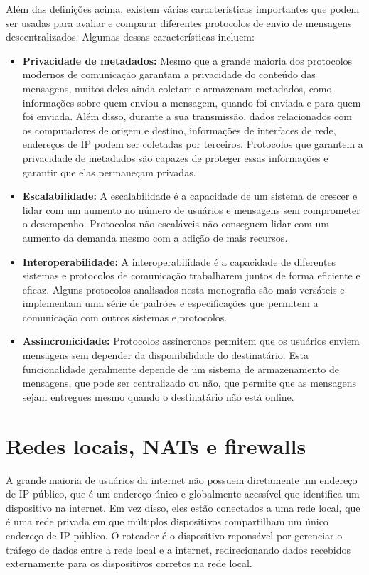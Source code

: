 Além das definições acima, existem várias características importantes que podem ser usadas para avaliar e comparar diferentes protocolos de envio de mensagens descentralizados. Algumas dessas características incluem:

\begin{itemize}
    \item \textbf{Privacidade de metadados:} Mesmo que a grande maioria dos protocolos modernos de comunicação garantam a privacidade do conteúdo das mensagens, muitos deles ainda coletam e armazenam metadados, como informações sobre quem enviou a mensagem, quando foi enviada e para quem foi enviada. Além disso, durante a sua transmissão, dados relacionados com os computadores de origem e destino, informações de interfaces de rede, endereços de IP podem ser coletadas por terceiros. Protocolos que garantem a privacidade de metadados são capazes de proteger essas informações e garantir que elas permaneçam privadas.
    
    \item \textbf{Escalabilidade:} A escalabilidade é a capacidade de um sistema de crescer e lidar com um aumento no número de usuários e mensagens sem comprometer o desempenho. Protocolos não escaláveis não conseguem lidar com um aumento da demanda mesmo com a adição de mais recursos.
    
    \item \textbf{Interoperabilidade:} A interoperabilidade é a capacidade de diferentes sistemas e protocolos de comunicação trabalharem juntos de forma eficiente e eficaz. Alguns protocolos analisados nesta monografia são mais versáteis e implementam uma série de padrões e especificações que permitem a comunicação com outros sistemas e protocolos.

    \item \textbf{Assincronicidade:} Protocolos assíncronos permitem que os usuários enviem mensagens sem depender da disponibilidade do destinatário. Esta funcionalidade geralmente depende de um sistema de armazenamento de mensagens, que pode ser centralizado ou não, que permite que as mensagens sejam entregues mesmo quando o destinatário não está online.
\end{itemize}

\section {Redes locais, NATs e firewalls}

A grande maioria de usuários da internet não possuem diretamente um endereço de IP público, que é um endereço único e globalmente acessível que identifica um dispositivo na internet. Em vez disso, eles estão conectados a uma rede local, que é uma rede privada em que múltiplos dispositivos compartilham um único endereço de IP público. O roteador é o dispositivo reponsável por gerenciar o tráfego de dados entre a rede local e a internet, redirecionando dados recebidos externamente para os dispositivos corretos na rede local. 

